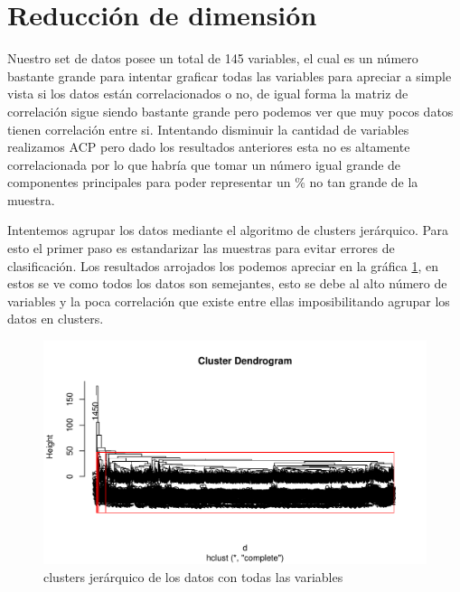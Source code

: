 \documentclass[a4paper,10pt,twocolumn]{article}
\begin{document}
\section{Reducción de dimensión}\label{sec:ex1}
	Nuestro set de datos posee un total de 145 variables, el cual es un número bastante grande  para intentar graficar todas las variables para apreciar a simple vista si los datos están correlacionados o no, de igual forma la matriz de correlación sigue siendo bastante grande pero podemos ver que muy pocos datos tienen correlación entre si. Intentando disminuir la cantidad de variables realizamos ACP pero dado los resultados anteriores esta no es altamente correlacionada por lo que habría que tomar un número igual grande de componentes principales para poder representar un \% no tan grande de la muestra.

	Intentemos agrupar los datos mediante el algoritmo de clusters jerárquico. Para esto el primer paso es estandarizar las muestras para evitar errores de clasificación. Los resultados arrojados los podemos apreciar en la gráfica \ref{fig:dendograma_1}, en estos se ve como todos los datos son semejantes, esto se debe al alto número de variables y la poca correlación que existe entre ellas imposibilitando agrupar los datos en clusters.

	\begin{figure}[htb]
		\begin{center}
			\includegraphics[width=\columnwidth]{figures/dendograma_1.pdf}
		\end{center}
		\caption{clusters jerárquico de los datos con todas las variables \label{fig:dendograma_1}}%
	\end{figure}
\end{document}
